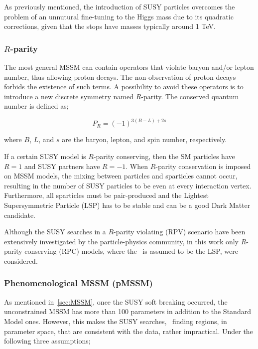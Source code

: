 			As previously mentioned, the introduction of SUSY particles overcomes the problem of an unnutural fine-tuning to the Higgs mass due to its quadratic corrections, given that the stops have masses typically around 1 TeV.

			\subsubsection*{$R$-parity}
				
				The most general MSSM can contain operators that violate baryon and/or lepton number, thus allowing proton decays. The non-observation of proton decays forbids the existence of such terms. A possibility to avoid these operators is to introduce a new discrete symmetry named $R$-parity. The conserved quantum number is defined as;

				\begin{equation}
					P_R = \left ( -1 \right )^{3 \left (B - L \right )+ 2s}
				\end{equation}

				\noindent where $B$, $L$, and $s$ are the baryon, lepton, and spin number, respectively.	

				If a certain SUSY model is $R$-parity conserving, then the SM particles have $R = 1$ and SUSY partners have $R=-1$. When $R$-parity conservation is imposed on MSSM models, the mixing between particles and sparticles cannot occur, resulting in the number of SUSY particles to be even at every interaction vertex. Furthermore, all sparticles must be pair-produced and the Lightest Supersymmetric Particle (LSP) has to be stable and can be a good Dark Matter candidate. %

				Although the SUSY searches in a $R$-parity violating (RPV) scenario have been extensively investigated by the particle-physics community, in this work only $R$-parity conserving (RPC) models, where the \ninoone\ is assumed to be the LSP, were considered.

			\subsubsection*{Phenomenological MSSM (pMSSM)}

				As mentioned in~\ref{sec:MSSM}, once the SUSY soft breaking occurred, the unconstrained MSSM has more than 100 parameters in addition to the Standard Model ones. However, this makes the SUSY searches, \eg\ finding regions, in parameter space, that are consistent with the data, rather impractical. Under the following three assumptions; 

